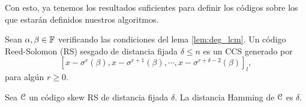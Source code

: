Con esto, ya tenemos los resultados suficientes para definir los códigos sobre los que estarán definidos nuestros algoritmos.

\begin{definition}
\label{def:RS_code}
    Sean \(\alpha, \beta \in \mathbb{F}\) verificando las condiciones del lema \ref{lem:deg_lcm}. Un código Reed-Solomon (RS) sesgado de distancia fijada \(\delta \leq n\) es un CCS generado por \[{[x - \sigma^r(\beta), x - \sigma^{r+1}(\beta), \cdots, x - \sigma^{r + \delta -2}(\beta)]}_l,\] para algún \(r \geq 0\).
\end{definition}

\begin{theorem}
\label{th:distance}
    Sea \(\mathcal{C}\) un código skew RS de distancia fijada \(\delta\). La distancia Hamming de \(\mathcal{C}\) es \(\delta\).
\end{theorem}

